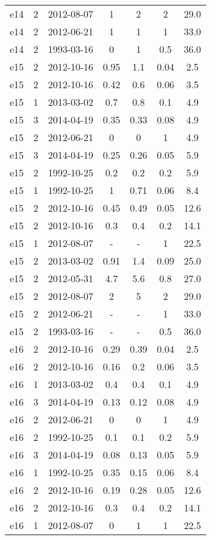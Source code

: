 \begin{table*}[htp]
\begin{tabular}{ccccccc}
e14 & 2 & 2012-08-07 & 1 & 2 & 2 & 29.0 \\
e14 & 2 & 2012-06-21 & 1 & 1 & 1 & 33.0 \\
e14 & 2 & 1993-03-16 & 0 & 1 & 0.5 & 36.0 \\
e15 & 2 & 2012-10-16 & 0.95 & 1.1 & 0.04 & 2.5 \\
e15 & 2 & 2012-10-16 & 0.42 & 0.6 & 0.06 & 3.5 \\
e15 & 1 & 2013-03-02 & 0.7 & 0.8 & 0.1 & 4.9 \\
e15 & 3 & 2014-04-19 & 0.35 & 0.33 & 0.08 & 4.9 \\
e15 & 2 & 2012-06-21 & 0 & 0 & 1 & 4.9 \\
e15 & 3 & 2014-04-19 & 0.25 & 0.26 & 0.05 & 5.9 \\
e15 & 2 & 1992-10-25 & 0.2 & 0.2 & 0.2 & 5.9 \\
e15 & 1 & 1992-10-25 & 1 & 0.71 & 0.06 & 8.4 \\
e15 & 2 & 2012-10-16 & 0.45 & 0.49 & 0.05 & 12.6 \\
e15 & 2 & 2012-10-16 & 0.3 & 0.4 & 0.2 & 14.1 \\
e15 & 1 & 2012-08-07 & - & - & 1 & 22.5 \\
e15 & 2 & 2013-03-02 & 0.91 & 1.4 & 0.09 & 25.0 \\
e15 & 2 & 2012-05-31 & 4.7 & 5.6 & 0.8 & 27.0 \\
e15 & 2 & 2012-08-07 & 2 & 5 & 2 & 29.0 \\
e15 & 2 & 2012-06-21 & - & - & 1 & 33.0 \\
e15 & 2 & 1993-03-16 & - & - & 0.5 & 36.0 \\
e16 & 2 & 2012-10-16 & 0.29 & 0.39 & 0.04 & 2.5 \\
e16 & 2 & 2012-10-16 & 0.16 & 0.2 & 0.06 & 3.5 \\
e16 & 1 & 2013-03-02 & 0.4 & 0.4 & 0.1 & 4.9 \\
e16 & 3 & 2014-04-19 & 0.13 & 0.12 & 0.08 & 4.9 \\
e16 & 2 & 2012-06-21 & 0 & 0 & 1 & 4.9 \\
e16 & 2 & 1992-10-25 & 0.1 & 0.1 & 0.2 & 5.9 \\
e16 & 3 & 2014-04-19 & 0.08 & 0.13 & 0.05 & 5.9 \\
e16 & 1 & 1992-10-25 & 0.35 & 0.15 & 0.06 & 8.4 \\
e16 & 2 & 2012-10-16 & 0.19 & 0.28 & 0.05 & 12.6 \\
e16 & 2 & 2012-10-16 & 0.3 & 0.4 & 0.2 & 14.1 \\
e16 & 1 & 2012-08-07 & 0 & 1 & 1 & 22.5 \\

\end{tabular}
\end{table*}
